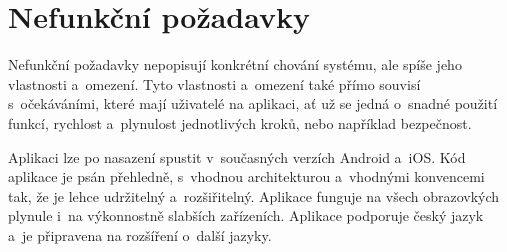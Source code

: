 \section{Nefunkční požadavky}

Nefunkční požadavky nepopisují konkrétní chování systému,
ale spíše jeho vlastnosti a~omezení.
Tyto vlastnosti a~omezení také přímo souvisí s~očekáváními,
které mají uživatelé na aplikaci,
ať už se jedná o~snadné použití funkcí,
rychlost a~plynulost jednotlivých kroků,
nebo například bezpečnost.~\cite{fr_nfr}

\begin{enumerate}[label=\textbf{N\arabic*}, ref=N\arabic*]
Aplikaci lze po nasazení spustit v~současných verzích Android a~iOS.
Kód aplikace je psán přehledně,
s~vhodnou architekturou a~vhodnými konvencemi tak,
že je lehce udržitelný a~rozšiřitelný.
Aplikace funguje na všech obrazovkých plynule
i~na výkonnostně slabších zařízeních.
Aplikace podporuje český jazyk
a~je připravena na rozšíření o~další jazyky.
\end{enumerate}
